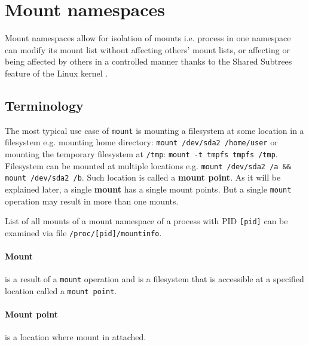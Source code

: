 \documentclass[licencjacka,en]{pracamgr}
\begin{document}
\section{Mount namespaces}

Mount namespaces allow for isolation of mounts i.e. process in one namespace can modify its mount list without affecting others' mount lists, or affecting or being affected by others in a controlled manner thanks to the Shared Subtrees feature of the Linux kernel \cite{shared_subtree}.

\subsection{Terminology}

The most typical use case of \texttt{mount} is mounting a filesystem at some location in a filesystem e.g. mounting home directory: \texttt{mount /dev/sda2 /home/user} or mounting the temporary filesystem at \texttt{/tmp}: \texttt{mount -t tmpfs tmpfs /tmp}. Filesystem can be mounted at multiple locations e.g. \texttt{mount /dev/sda2 /a \&\& mount /dev/sda2 /b}. Such location is called a \textbf{mount point}. As it will be explained later, a single \textbf{mount} has a single mount points. But a single \texttt{mount} operation may result in more than one mounts.

List of all mounts of a mount namespace of a process with PID \texttt{[pid]} can be examined via file \texttt{/proc/[pid]/mountinfo}.

\paragraph{Mount} is a result of a \texttt{mount} operation and is a filesystem that is accessible at a specified location called a \texttt{mount point}.

\paragraph{Mount point} is a location where mount in attached.
\end{document}
